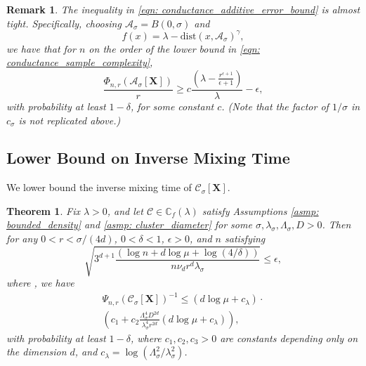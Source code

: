 \documentclass{article}
\newcommand{\1}{\mathbf{1}}
\newcommand{\dist}{\mathrm{dist}}
\newcommand{\Xbf}{\mathbf{X}}
\newcommand{\Cbb}{\mathbb{C}}
\newcommand{\Cset}{\mathcal{C}}
\newcommand{\Aset}{\mathcal{A}}
\newcommand{\Asig}{\Aset_{\sigma}}
\newcommand{\Csig}{\Cset_{\sigma}}
\theoremstyle{aldenthm}
\newtheorem{theorem}{Theorem}
\theoremstyle{aldenrmrk}
\newtheorem{remark}{Remark}
\begin{document}
\begin{remark}
The inequality in \eqref{eqn: conductance_additive_error_bound} is almost
tight. Specifically, choosing $\Asig = B(0,\sigma)$ and
$$
f(x) = \lambda - \dist(x,\Asig)^{\gamma},
$$
we have that for $n$ on the order of the lower bound in \eqref{eqn: 
  conductance_sample_complexity}, 
\begin{equation*}
  \frac{\Phi_{n,r}(\Asig[\mathbf{X}])}{r} \geq c \frac{(\lambda -
    \frac{r^{\epsilon+1}}{\epsilon+1})}{\lambda} - \epsilon,
\end{equation*}
with probability at least $1 - \delta$, for some constant $c$. (Note that the
factor of $1 / \sigma$ in $c_{\sigma}$ is not replicated above.)
\end{remark}

\subsection{Lower Bound on Inverse Mixing Time}

We lower bound the inverse mixing time of $\Csig[\Xbf]$.

\begin{theorem}
\label{thm: inverse_mixing_time_lower_bound_nonconvex}
Fix $\lambda > 0$, and let $\Cset \in \Cbb_f(\lambda)$ satisfy
Assumptions \ref{asmp: bounded_density} and \ref{asmp: cluster_diameter} 
for some $\sigma, \lambda_{\sigma}, \Lambda_{\sigma}, D > 0$. Then for any $0 <
r < \sigma/(4d)$, $0 < \delta < 1$, $\epsilon > 0$, and $n$ satisfying 
$$
\sqrt{3^{d+1}\frac{(\log n + d\log \mu + \log(4/\delta))}{n \nu_d r^d
    \lambda_{\sigma}}} \leq \epsilon, 
$$
where , we have
\begin{multline}
\label{eqn: inverse_mixing_time_lower_bound_nonconvex}
\Psi_{n,r}(\Csig[\Xbf])^{-1} \leq (d \log \mu + c_{\lambda}) \cdot \\  
\left(c_1 + c_2 \frac{\Lambda_{\sigma}^4D^{2d}}{\lambda_{\sigma}^4r^{2d}}\left(d
    \log \mu + c_{\lambda}\right)\right),
\end{multline}
with probability at least $1 - \delta$, where $c_1,c_2,c_3>0$ are constants
depending only on the dimension $d$, and $c_{\lambda} = \log(\Lambda_{\sigma}^2/
\lambda_{\sigma}^2)$.   
\end{theorem}
\end{document}
